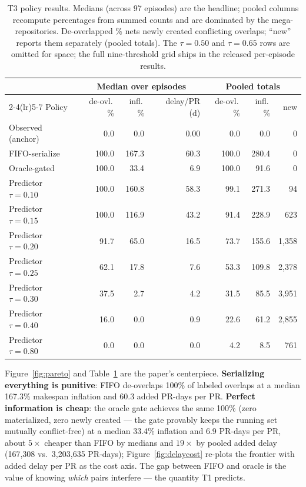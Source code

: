 \documentclass{article}
\begin{document}
\begin{table}[t]
\centering
\caption{T3 policy results. Medians (across 97 episodes) are the headline; pooled columns recompute percentages from summed counts and are dominated by the mega-repositories. De-overlapped \% nets newly created conflicting overlaps; ``new'' reports them separately (pooled totals). The $\tau{=}0.50$ and $\tau{=}0.65$ rows are omitted for space; the full nine-threshold grid ships in the released per-episode results.}
\label{tab:t3}
\small
\begin{tabular}{lrrrrrr}
\toprule
 & \multicolumn{3}{c}{Median over episodes} & \multicolumn{3}{c}{Pooled totals} \\
\cmidrule(lr){2-4}\cmidrule(lr){5-7}
Policy & de-ovl.\,\% & infl.\,\% & delay/PR (d) & de-ovl.\,\% & infl.\,\% & new \\
\midrule
Observed (anchor) & 0.0 & 0.0 & 0.00 & 0.0 & 0.0 & 0 \\ %
FIFO-serialize & 100.0 & 167.3 & 60.3 & 100.0 & 280.4 & 0 \\ %
Oracle-gated & 100.0 & 33.4 & 6.9 & 100.0 & 91.6 & 0 \\ %
Predictor $\tau{=}0.10$ & 100.0 & 160.8 & 58.3 & 99.1 & 271.3 & 94 \\ %
Predictor $\tau{=}0.15$ & 100.0 & 116.9 & 43.2 & 91.4 & 228.9 & 623 \\ %
Predictor $\tau{=}0.20$ & 91.7 & 65.0 & 16.5 & 73.7 & 155.6 & 1{,}358 \\ %
Predictor $\tau{=}0.25$ & 62.1 & 17.8 & 7.6 & 53.3 & 109.8 & 2{,}378 \\ %
Predictor $\tau{=}0.30$ & 37.5 & 2.7 & 4.2 & 31.5 & 85.5 & 3{,}951 \\ %
Predictor $\tau{=}0.40$ & 16.0 & 0.0 & 0.9 & 22.6 & 61.2 & 2{,}855 \\ %
Predictor $\tau{=}0.80$ & 0.0 & 0.0 & 0.0 & 4.2 & 8.5 & 761 \\ %
\bottomrule
\end{tabular}
\end{table}

Figure~\ref{fig:pareto} and Table~\ref{tab:t3} are the paper's centerpiece. \textbf{Serializing everything is punitive}: FIFO de-overlaps 100\% of labeled overlaps at a median 167.3\% makespan inflation and 60.3 added PR-days per PR. \textbf{Perfect information is cheap}: the oracle gate achieves the same 100\% (zero materialized, zero newly created --- the gate provably keeps the running set mutually conflict-free) at a median 33.4\% inflation and 6.9 PR-days per PR, about $5\times$ cheaper than FIFO by medians and $19\times$ by pooled added delay (167{,}308 vs.\ 3{,}203{,}635 PR-days); Figure~\ref{fig:delaycost} re-plots the frontier with added delay per PR as the cost axis. %
The gap between FIFO and oracle is the value of knowing \emph{which} pairs interfere --- the quantity T1 predicts.
\end{document}
